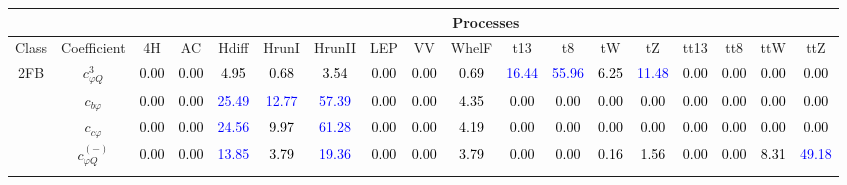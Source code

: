\documentclass{article}
\begin{document}
\begin{landscape}
\begin{table}[H]
\scriptsize
\centering
\begin{tabular}{|c|c|c|c|c|c|c|c|c|c|c|c|c|c|c|c|c|c|}
\hline
\multicolumn{2}{|c|}{}                 & \multicolumn{16}{c|}{Processes} \\ \hline
 Class & Coefficient & {\rm 4H }& {\rm AC }& {\rm Hdiff }& {\rm HrunI }& {\rm HrunII }& {\rm LEP }& {\rm VV }& {\rm WhelF }& {\rm t13 }& {\rm t8 }& {\rm tW }& {\rm tZ }& {\rm tt13 }& {\rm tt8 }& {\rm ttW }& {\rm ttZ }\\ \hline
\multirow{10}{*}{2FB}
 & $c_{\varphi Q}^{3}$ & \textcolor{black}{0.00} & \textcolor{black}{0.00} & \textcolor{black}{4.95} & \textcolor{black}{0.68} & \textcolor{black}{3.54} & \textcolor{black}{0.00} & \textcolor{black}{0.00} & \textcolor{black}{0.69} & \textcolor{blue}{16.44} & \textcolor{blue}{55.96} & \textcolor{black}{6.25} & \textcolor{blue}{11.48} & \textcolor{black}{0.00} & \textcolor{black}{0.00} & \textcolor{black}{0.00} & \textcolor{black}{0.00}\\ \cline{2-18}
 & $c_{b \varphi}$ & \textcolor{black}{0.00} & \textcolor{black}{0.00} & \textcolor{blue}{25.49} & \textcolor{blue}{12.77} & \textcolor{blue}{57.39} & \textcolor{black}{0.00} & \textcolor{black}{0.00} & \textcolor{black}{4.35} & \textcolor{black}{0.00} & \textcolor{black}{0.00} & \textcolor{black}{0.00} & \textcolor{black}{0.00} & \textcolor{black}{0.00} & \textcolor{black}{0.00} & \textcolor{black}{0.00} & \textcolor{black}{0.00}\\ \cline{2-18}
 & $c_{c \varphi}$ & \textcolor{black}{0.00} & \textcolor{black}{0.00} & \textcolor{blue}{24.56} & \textcolor{black}{9.97} & \textcolor{blue}{61.28} & \textcolor{black}{0.00} & \textcolor{black}{0.00} & \textcolor{black}{4.19} & \textcolor{black}{0.00} & \textcolor{black}{0.00} & \textcolor{black}{0.00} & \textcolor{black}{0.00} & \textcolor{black}{0.00} & \textcolor{black}{0.00} & \textcolor{black}{0.00} & \textcolor{black}{0.00}\\ \cline{2-18}
 & $c_{\varphi Q}^{(-)}$ & \textcolor{black}{0.00} & \textcolor{black}{0.00} & \textcolor{blue}{13.85} & \textcolor{black}{3.79} & \textcolor{blue}{19.36} & \textcolor{black}{0.00} & \textcolor{black}{0.00} & \textcolor{black}{3.79} & \textcolor{black}{0.00} & \textcolor{black}{0.00} & \textcolor{black}{0.16} & \textcolor{black}{1.56} & \textcolor{black}{0.00} & \textcolor{black}{0.00} & \textcolor{black}{8.31} & \textcolor{blue}{49.18}\\ \cline{2-18}

\end{tabular}
\end{table}
\end{landscape}
\end{document}
